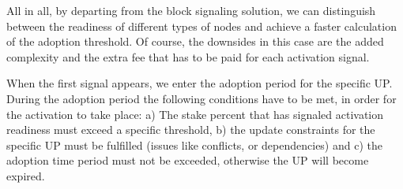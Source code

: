 All in all, by departing from the block signaling solution, we can distinguish between the readiness of different types of nodes and achieve a faster calculation of the adoption threshold. Of course, the downsides in this case are the  added complexity and the extra fee that has to be paid for each activation signal.


When the first signal appears, we enter the adoption period for the specific UP. During the adoption period the following conditions have to be met, in order for the activation to take place: a) The stake percent that has signaled activation readiness must exceed a specific threshold, b) the update constraints for the specific UP must be fulfilled (issues like conflicts, or dependencies) and c) the adoption time period must not be exceeded, otherwise the UP will become expired. 


